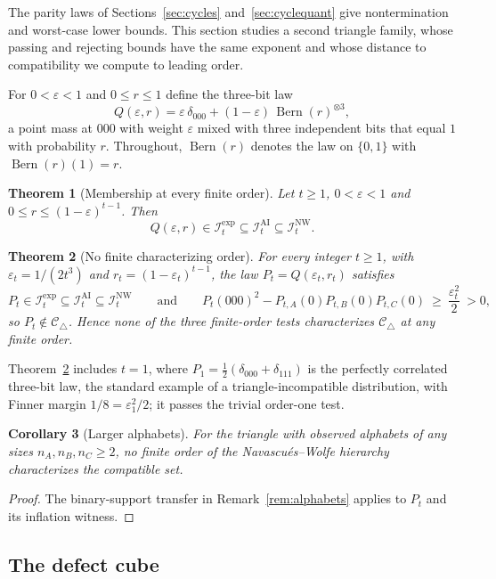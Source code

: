 \documentclass[11pt]{article}
\theoremstyle{plain}
\newtheorem{theorem}{Theorem}[section]
\newtheorem{corollary}[theorem]{Corollary}
\theoremstyle{definition}
\DeclareMathOperator{\Bern}{Bern}
\newcommand{\Ctri}{\mathcal C_{\triangle}}
\newcommand{\INW}{\mathcal I^{\mathrm{NW}}}
\newcommand{\IAI}{\mathcal I^{\mathrm{AI}}}
\newcommand{\Iexp}{\mathcal I^{\mathrm{exp}}}
\newcommand{\eps}{\varepsilon}
\begin{document}
The parity laws of Sections~\ref{sec:cycles} and~\ref{sec:cyclequant} give nontermination and worst-case lower bounds. This section studies a second triangle family, whose passing and rejecting bounds have the same exponent and whose distance to compatibility we compute to leading order.

For $0<\eps<1$ and $0\le r\le1$ define the three-bit law
\begin{equation}\label{eq:Q}
Q(\eps,r)=\eps\,\delta_{000}+(1-\eps)\,\Bern(r)^{\otimes3},
\end{equation}
a point mass at $000$ with weight $\eps$ mixed with three independent bits that equal $1$ with probability $r$. Throughout, $\Bern(r)$ denotes the law on $\{0,1\}$ with $\Bern(r)(1)=r$.

\begin{theorem}[Membership at every finite order]\label{thm:membership}
Let $t\ge1$, $0<\eps<1$ and $0\le r\le(1-\eps)^{t-1}$. Then
\[
Q(\eps,r)\in\Iexp_t\subseteq\IAI_t\subseteq\INW_t.
\]
\end{theorem}

\begin{theorem}[No finite characterizing order]\label{thm:main}\label{thm:main-intro}
For every integer $t\ge1$, with $\eps_t=1/(2t^3)$ and $r_t=(1-\eps_t)^{t-1}$, the law $P_t=Q(\eps_t,r_t)$ satisfies
\[
P_t\in\Iexp_t\subseteq\IAI_t\subseteq\INW_t
\qquad\text{and}\qquad
P_t(000)^2-P_{t,A}(0)P_{t,B}(0)P_{t,C}(0)\ \ge\ \frac{\eps_t^2}{2}\ >0,
\]
so $P_t\notin\Ctri$. Hence none of the three finite-order tests characterizes $\Ctri$ at any finite order.
\end{theorem}

Theorem~\ref{thm:main} includes $t=1$, where $P_1=\tfrac12(\delta_{000}+\delta_{111})$ is the perfectly correlated three-bit law, the standard example of a triangle-incompatible distribution, with Finner margin $1/8=\eps_1^2/2$; it passes the trivial order-one test.

\begin{corollary}[Larger alphabets]\label{cor:alphabets}
For the triangle with observed alphabets of any sizes $n_A,n_B,n_C\ge2$, no finite order of the Navascués--Wolfe hierarchy characterizes the compatible set.
\end{corollary}
\begin{proof}
The binary-support transfer in Remark~\ref{rem:alphabets} applies to $P_t$ and its inflation witness.
\end{proof}


\subsection{The defect cube}\label{sec:construction}
\end{document}
